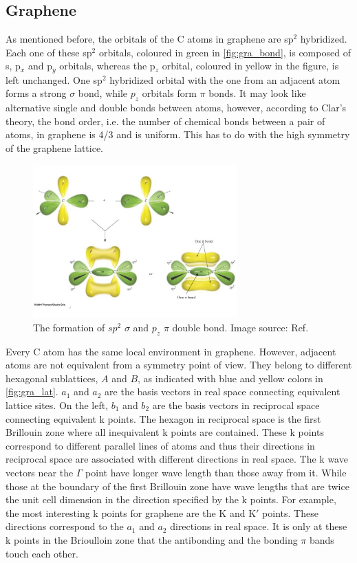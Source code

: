\subsection{Graphene}

As mentioned before, the orbitals of the C atoms in graphene are sp$^2$ hybridized. Each one of these sp$^2$ orbitals, coloured in green in \autoref{fig:gra_bond}, is composed of s, p$_x$ and p$_y$ orbitals, whereas the p$_z$ orbital, coloured in yellow in the figure, is left unchanged. One sp$^2$ hybridized orbital with the one from an adjacent atom forms a strong $\sigma$ bond, while $p_z$ orbitals form $\pi$ bonds. It may look like alternative single and double bonds between atoms, however, according to Clar's theory, the bond order, i.e. the number of chemical bonds between a pair of atoms, in graphene is 4/3 and is uniform\cite{Wassmann2010}. This has to do with the high symmetry of the graphene lattice.

\begin{figure}[htbp!] 
\centering  
\includegraphics[width=0.7\textwidth]{double_bond}
\caption[The formation of $sp^2$ $\sigma$ and $p_z$ $\pi$ double bond]{ The formation of $sp^2$ $\sigma$ and $p_z$ $\pi$ double bond. Image source: Ref. \cite{gra_bond} }  
\label{fig:gra_bond}
\end{figure} 

Every C atom has the same local environment in graphene. However, adjacent atoms are not equivalent from a symmetry point of view. They belong to different hexagonal sublattices, $A$ and $B$, as indicated with blue and yellow colors in \autoref{fig:gra_lat}. $a_1$ and $a_2$ are the basis vectors in real space connecting equivalent lattice sites. On the left, $b_1$ and $b_2$ are the basis vectors in reciprocal space connecting equivalent k points. The hexagon in reciprocal space is the first Brillouin zone where all inequivalent k points are contained. These k points correspond to different parallel lines of atoms and thus their directions in reciprocal space are associated with different directions in real space. The k wave vectors near the $\Gamma$ point have longer wave length than those away from it. While those at the boundary of the first Brillouin zone have wave lengths that are twice the unit cell dimension in the direction specified by the k points. For example, the most interesting k points for graphene are the $\mathrm{K}$ and $\mathrm{K}'$ points. These directions correspond to the $a_1$ and $a_2$ directions in real space. It is only at these k points in the Brioulloin zone that the antibonding and the bonding $\pi$ bands touch each other.  

